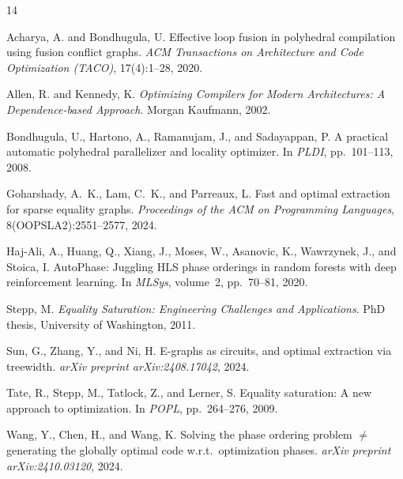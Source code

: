 \documentclass[11pt]{article}
\begin{document}
\begin{thebibliography}{14}

Acharya, A. and Bondhugula, U.
\newblock Effective loop fusion in polyhedral compilation using fusion conflict graphs.
\newblock \emph{ACM Transactions on Architecture and Code Optimization (TACO)}, 17(4):1--28, 2020.

Allen, R. and Kennedy, K.
\newblock \emph{Optimizing Compilers for Modern Architectures: A Dependence-based Approach}.
\newblock Morgan Kaufmann, 2002.

Bondhugula, U., Hartono, A., Ramanujam, J., and Sadayappan, P.
\newblock A practical automatic polyhedral parallelizer and locality optimizer.
\newblock In \emph{PLDI}, pp.~101--113, 2008.

Goharshady, A.~K., Lam, C.~K., and Parreaux, L.
\newblock Fast and optimal extraction for sparse equality graphs.
\newblock \emph{Proceedings of the ACM on Programming Languages}, 8(OOPSLA2):2551--2577, 2024.

Haj-Ali, A., Huang, Q., Xiang, J., Moses, W., Asanovic, K., Wawrzynek, J., and Stoica, I.
\newblock AutoPhase: Juggling HLS phase orderings in random forests with deep reinforcement learning.
\newblock In \emph{MLSys}, volume~2, pp.~70--81, 2020.

Stepp, M.
\newblock \emph{Equality Saturation: Engineering Challenges and Applications}.
\newblock PhD thesis, University of Washington, 2011.

Sun, G., Zhang, Y., and Ni, H.
\newblock E-graphs as circuits, and optimal extraction via treewidth.
\newblock \emph{arXiv preprint arXiv:2408.17042}, 2024.

Tate, R., Stepp, M., Tatlock, Z., and Lerner, S.
\newblock Equality saturation: A new approach to optimization.
\newblock In \emph{POPL}, pp.~264--276, 2009.

Wang, Y., Chen, H., and Wang, K.
\newblock Solving the phase ordering problem $\neq$ generating the globally optimal code w.r.t.\ optimization phases.
\newblock \emph{arXiv preprint arXiv:2410.03120}, 2024.


\end{thebibliography}
\end{document}
